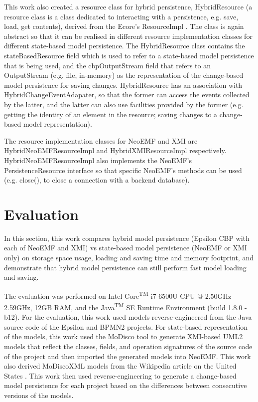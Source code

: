 This work also created a resource class for hybrid persistence, \textsf{HybridResource} (a resource class is a class dedicated to interacting with a persistence, e.g. save, load, get contents), derived from the Ecore's \textsf{ResourceImpl} \cite{eclipse2018resourceImpl}
. The class is again abstract so that it can be realised in different resource implementation classes for different state-based model persistence. The \textsf{HybridResource} class contains the \textsf{stateBasedResource} field which is used to refer to a state-based model persistence that is being used, and the \textsf{cbpOutputStream} field that refers to an \textsf{OutputStream} (e.g. file, in-memory) as the representation of the change-based model persistence for saving changes. \textsf{HybridResource} has an association with \textsf{HybridChangeEventAdapater}, so that the former can access the events collected by the latter, and the latter can also use facilities provided by the former (e.g. getting the identity of an element in the resource; saving changes to a change-based model representation).

The resource implementation classes for NeoEMF and XMI are \textsf{HybridNeoEMFResourceImpl} and \textsf{HybridXMIResourceImpl} respectively. \textsf{HybridNeoEMFResourceImpl} also implements the NeoEMF's \textsf{PersistenceResource} interface \cite{atlanmod2018persistentResource}
so that specific NeoEMF's methods can be used (e.g. \textsf{close}(), to close a connection with a backend database).

\section{Evaluation}
\label{sec:evaluation}
In this section, this work compares hybrid model persistence (Epsilon CBP with each of NeoEMF and XMI) vs state-based model persistence (NeoEMF or XMI only) on storage space usage, loading and saving time and memory footprint, and demonstrate that hybrid model persistence can still perform fast model loading and saving. 

The evaluation was performed on Intel\textsuperscript{\textregistered} Core\textsuperscript{TM} i7-6500U CPU @ 2.50GHz 2.59GHz, 12GB RAM, and the Java\textsuperscript{TM} SE Runtime Environment (build 1.8.0 -b12). For the evaluation, this work used models reverse-engineered from the Java source code of the Epsilon \cite{eclipse2017epsilon,eclipse2018epsilongit} and BPMN2 \cite{eclipse2017bpmn2} projects. For state-based representation of the models, this work used the MoDisco tool \cite{DBLP:journals/infsof/BruneliereCDM14} to generate XMI-based UML2 \cite{eclipse2017uml2} models that reflect the classes, fields, and operation signatures of the source code of the project and then imported the generated models into NeoEMF. This work also derived MoDiscoXML models \cite{eclipse2018modiscoxml} from the Wikipedia article on the United States \cite{wikipedia2018us}. This work then used reverse-engineering to generate a change-based model persistence for each project based on the differences between consecutive versions of the models.

